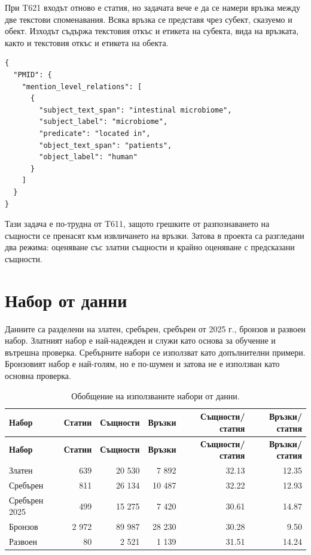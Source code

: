 \documentclass[12pt,a4paper]{article}
\begin{document}
При T621 входът отново е статия, но задачата вече е да се намери връзка между две текстови споменавания. Всяка връзка се представя чрез субект, сказуемо и обект. Изходът съдържа текстовия откъс и етикета на субекта, вида на връзката, както и текстовия откъс и етикета на обекта.

\begin{verbatim}
{
  "PMID": {
    "mention_level_relations": [
      {
        "subject_text_span": "intestinal microbiome",
        "subject_label": "microbiome",
        "predicate": "located in",
        "object_text_span": "patients",
        "object_label": "human"
      }
    ]
  }
}
\end{verbatim}

Тази задача е по-трудна от T611, защото грешките от разпознаването на същности се пренасят към извличането на връзки. Затова в проекта са разгледани два режима: оценяване със златни същности и крайно оценяване с предсказани същности.

\section{Набор от данни}

Данните са разделени на златен, сребърен, сребърен от 2025 г., бронзов и развоен набор. Златният набор е най-надежден и служи като основа за обучение и вътрешна проверка. Сребърните набори се използват като допълнителни примери. Бронзовият набор е най-голям, но е по-шумен и затова не е използван като основна проверка.

\begin{longtable}{p{3.1cm}rrrrr}
\caption{Обобщение на използваните набори от данни.}\\
\toprule
\textbf{Набор} & \textbf{Статии} & \textbf{Същности} & \textbf{Връзки} & \textbf{Същности/статия} & \textbf{Връзки/статия} \\
\midrule
\endfirsthead
\toprule
\textbf{Набор} & \textbf{Статии} & \textbf{Същности} & \textbf{Връзки} & \textbf{Същности/статия} & \textbf{Връзки/статия} \\
\midrule
\endhead
Златен & 639 & 20 530 & 7 892 & 32.13 & 12.35 \\
Сребърен & 811 & 26 134 & 10 487 & 32.22 & 12.93 \\
Сребърен 2025 & 499 & 15 275 & 7 420 & 30.61 & 14.87 \\
Бронзов & 2 972 & 89 987 & 28 230 & 30.28 & 9.50 \\
Развоен & 80 & 2 521 & 1 139 & 31.51 & 14.24 \\
\bottomrule
\end{longtable}
\end{document}
